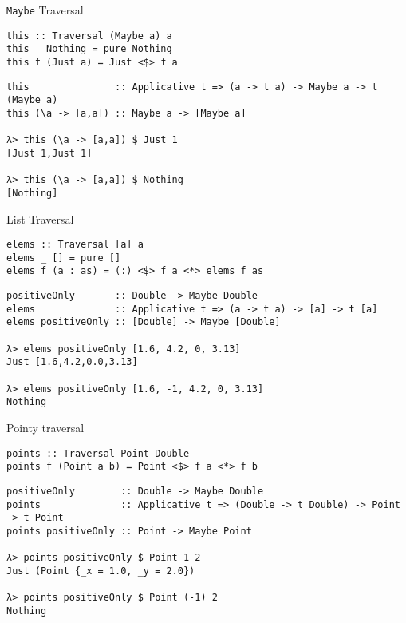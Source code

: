 \documentclass[presentation,aspectratio=169,8pt]{beamer}
\begin{document}
\begin{frame}[label={sec:org91aac1c},fragile]{\texttt{Maybe} Traversal}
 \begin{verbatim}
this :: Traversal (Maybe a) a
this _ Nothing = pure Nothing
this f (Just a) = Just <$> f a
\end{verbatim}

\pause

\begin{verbatim}
this               :: Applicative t => (a -> t a) -> Maybe a -> t (Maybe a)
this (\a -> [a,a]) :: Maybe a -> [Maybe a]

λ> this (\a -> [a,a]) $ Just 1
[Just 1,Just 1]

λ> this (\a -> [a,a]) $ Nothing
[Nothing]
\end{verbatim}
\end{frame}

\begin{frame}[label={sec:org6949f30},fragile]{List Traversal}
 \begin{verbatim}
elems :: Traversal [a] a
elems _ [] = pure []
elems f (a : as) = (:) <$> f a <*> elems f as
\end{verbatim}

\pause

\begin{verbatim}
positiveOnly       :: Double -> Maybe Double
elems              :: Applicative t => (a -> t a) -> [a] -> t [a]
elems positiveOnly :: [Double] -> Maybe [Double]

λ> elems positiveOnly [1.6, 4.2, 0, 3.13]
Just [1.6,4.2,0.0,3.13]

λ> elems positiveOnly [1.6, -1, 4.2, 0, 3.13]
Nothing
\end{verbatim}
\end{frame}

\begin{frame}[label={sec:orgeef6620},fragile]{Pointy traversal}
 \begin{verbatim}
points :: Traversal Point Double
points f (Point a b) = Point <$> f a <*> f b
\end{verbatim}

\pause

\begin{verbatim}
positiveOnly        :: Double -> Maybe Double
points              :: Applicative t => (Double -> t Double) -> Point -> t Point
points positiveOnly :: Point -> Maybe Point

λ> points positiveOnly $ Point 1 2
Just (Point {_x = 1.0, _y = 2.0})

λ> points positiveOnly $ Point (-1) 2
Nothing
\end{verbatim}
\end{frame}
\end{document}
